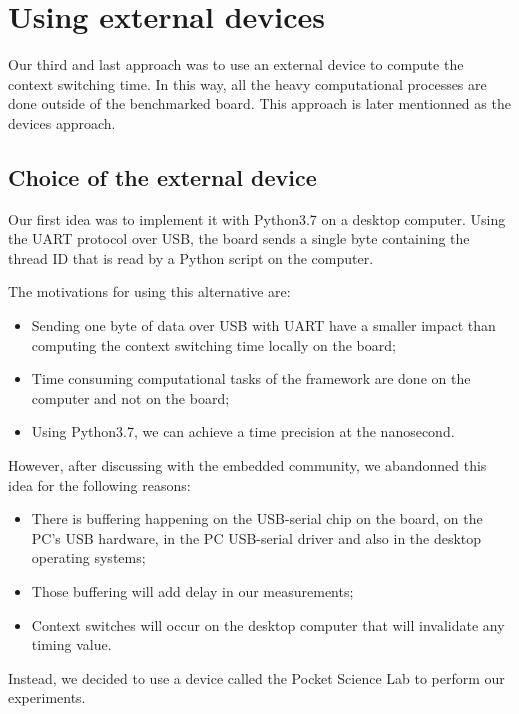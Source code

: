 \section{Using external devices \label{sec:external}}

Our third and last approach was to use an external device to compute the context switching time.
In this way, all the heavy computational processes are done outside of the benchmarked board.
This approach is later mentionned as the devices approach.

\subsection{Choice of the external device}

Our first idea was to implement it with Python3.7 on a desktop computer.
Using the UART protocol over USB, the board sends a single byte containing the thread ID that is read by a Python script on the computer.

The motivations for using this alternative are:
\begin{itemize}
  \item Sending one byte of data over USB with UART have a smaller impact than computing the context switching time locally on the board;
  \item Time consuming computational tasks of the framework are done on the computer and not on the board;
  \item Using Python3.7, we can achieve a time precision at the nanosecond.
\end{itemize}

However, after discussing with the embedded community, we abandonned this idea for the following reasons:
\begin{itemize}
  \item There is buffering happening on the USB-serial chip on the board, on the PC's USB hardware, in the PC USB-serial driver 
    and also in the desktop operating systems;
  \item Those buffering will add delay in our measurements;
  \item Context switches will occur on the desktop computer that will invalidate any timing value.
\end{itemize}


Instead, we decided to use a device called the Pocket Science Lab to perform our experiments.

